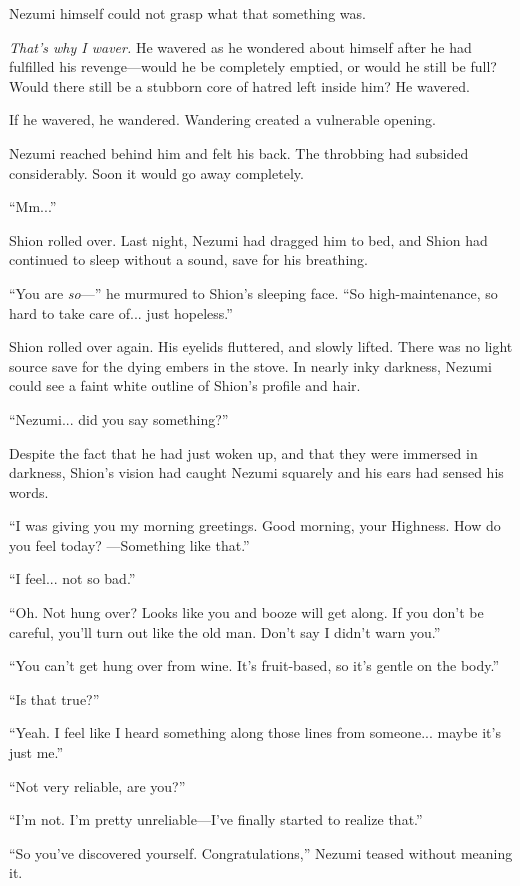 Nezumi himself could not grasp what that something was.

\emph{That's why I waver.} He wavered as he wondered about himself after he had
fulfilled his revenge---would he be completely emptied, or would he still
be full? Would there still be a stubborn core of hatred left inside him?
He wavered.

If he wavered, he wandered. Wandering created a vulnerable opening.

Nezumi reached behind him and felt his back. The throbbing had subsided
considerably. Soon it would go away completely.

``Mm...''

Shion rolled over. Last night, Nezumi had dragged him to bed, and Shion
had continued to sleep without a sound, save for his breathing.

``You are \emph{so}---'' he murmured to Shion's sleeping face. ``So
high-maintenance, so hard to take care of... just hopeless.''

Shion rolled over again. His eyelids fluttered, and slowly lifted. There
was no light source save for the dying embers in the stove. In nearly
inky darkness, Nezumi could see a faint white outline of Shion's profile
and hair.

``Nezumi... did you say something?''

Despite the fact that he had just woken up, and that they were immersed
in darkness, Shion's vision had caught Nezumi squarely and his ears had
sensed his words.

``I was giving you my morning greetings. Good morning, your Highness.
How do you feel today? ---Something like that.''

``I feel... not so bad.''

``Oh. Not hung over? Looks like you and booze will get along. If you
don't be careful, you'll turn out like the old man. Don't say I didn't
warn you.''

``You can't get hung over from wine. It's fruit-based, so it's gentle on
the body.''

``Is that true?''

``Yeah. I feel like I heard something along those lines from someone...
maybe it's just me.''

``Not very reliable, are you?''

``I'm not. I'm pretty unreliable---I've finally started to realize that.''

``So you've discovered yourself. Congratulations,'' Nezumi teased
without meaning it.

